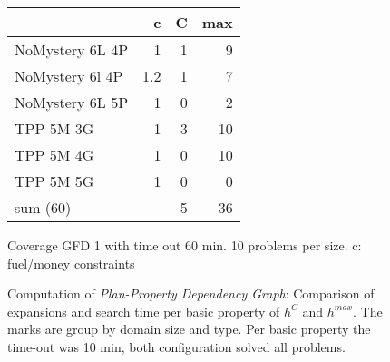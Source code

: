 \setlength{\tabcolsep}{3pt}
\begin{figure}[ht]
	\centering
	\begin{tabular}{l|r|rr}
			& c & C & max \\\hline
		NoMystery 6L 4P & 1 & 1 & 9 \\
		NoMystery 6l 4P & 1.2 & 1 & 7\\
		NoMystery 6L 5P & 1 & 0 & 2\\
		TPP 5M 3G & 1 & 3 & 10\\
		TPP 5M 4G & 1 & 0 & 10\\
		TPP 5M 5G & 1 & 0 &	0 \\\hline
		sum \numtasks(60) & - & 5 & 36 \\
	\end{tabular}
	\caption{Coverage GFD 1 with time out 60 min. 10 problems per size. c: fuel/money constraints }
\end{figure}

\begin{figure}[ht]
		

		
		\caption{Computation of \emph{Plan-Property Dependency Graph}: Comparison of expansions and search time per basic property of $h^C$ and $h^{max}$. 
		The marks are group by domain size and type. 
		Per basic property the time-out was 10 min, both configuration solved all problems.}
\end{figure}


